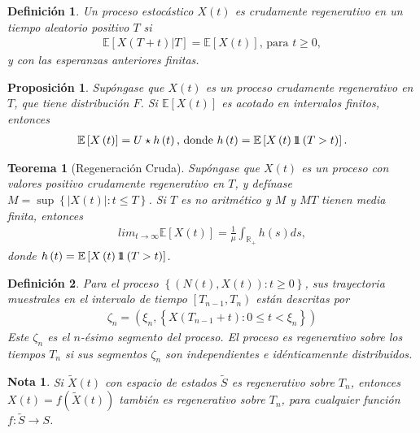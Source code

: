 \documentclass{article}
\newtheorem{Def}{Definición}
\newtheorem{Teo}{Teorema}
\newtheorem{Note}{Nota}
\newtheorem{Prop}{Proposición}
\newcommand{\rea}{\mathbb{R}}
\newcommand{\esp}{\mathbb{E}}
\newcommand{\indora}{\mbox{$1$\hspace{-0.8ex}$1$}}
\begin{document}
\begin{Def}
Un proceso estoc\'astico $X\left(t\right)$ es crudamente regenerativo en un tiempo aleatorio positivo $T$ si
\begin{eqnarray*}
\esp\left[X\left(T+t\right)|T\right]=\esp\left[X\left(t\right)\right]\textrm{, para }t\geq0,\end{eqnarray*}
y con las esperanzas anteriores finitas.
\end{Def}

\begin{Prop}
Sup\'ongase que $X\left(t\right)$ es un proceso crudamente regenerativo en $T$, que tiene distribuci\'on $F$. Si $\esp\left[X\left(t\right)\right]$ es acotado en intervalos finitos, entonces
\begin{eqnarray*}
\esp\left[X\left(t\right)\right]=U\star h\left(t\right)\textrm{,  donde }h\left(t\right)=\esp\left[X\left(t\right)\indora\left(T>t\right)\right].
\end{eqnarray*}
\end{Prop}

\begin{Teo}[Regeneraci\'on Cruda]
Sup\'ongase que $X\left(t\right)$ es un proceso con valores positivo crudamente regenerativo en $T$, y def\'inase $M=\sup\left\{|X\left(t\right)|:t\leq T\right\}$. Si $T$ es no aritm\'etico y $M$ y $MT$ tienen media finita, entonces
\begin{eqnarray*}
lim_{t\rightarrow\infty}\esp\left[X\left(t\right)\right]=\frac{1}{\mu}\int_{\rea_{+}}h\left(s\right)ds,
\end{eqnarray*}
donde $h\left(t\right)=\esp\left[X\left(t\right)\indora\left(T>t\right)\right]$.
\end{Teo}

\begin{Def}
Para el proceso $\left\{\left(N\left(t\right),X\left(t\right)\right):t\geq0\right\}$, sus trayectoria muestrales en el intervalo de tiempo $\left[T_{n-1},T_{n}\right)$ est\'an descritas por
\begin{eqnarray*}
\zeta_{n}=\left(\xi_{n},\left\{X\left(T_{n-1}+t\right):0\leq t<\xi_{n}\right\}\right)
\end{eqnarray*}
Este $\zeta_{n}$ es el $n$-\'esimo segmento del proceso. El proceso es regenerativo sobre los tiempos $T_{n}$ si sus segmentos $\zeta_{n}$ son independientes e id\'enticamennte distribuidos.
\end{Def}


\begin{Note}
Si $\tilde{X}\left(t\right)$ con espacio de estados $\tilde{S}$ es regenerativo sobre $T_{n}$, entonces $X\left(t\right)=f\left(\tilde{X}\left(t\right)\right)$ tambi\'en es regenerativo sobre $T_{n}$, para cualquier funci\'on $f:\tilde{S}\rightarrow S$.
\end{Note}
\end{document}
